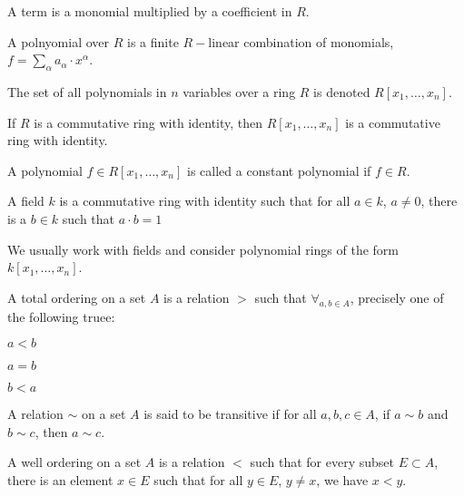 \documentclass[crop=false,class=article,oneside]{standalone}
\begin{document}
    \begin{definition}
    A term is a monomial multiplied by a coefficient in $R$.
    \end{definition}
    \begin{definition}
    A polnyomial over $R$ is a finite $R-$linear combination of monomials, $f=\sum_{\alpha} a_{\alpha} \cdot x^{\alpha}$.
    \end{definition}
    \begin{notation}
    The set of all polynomials in $n$ variables over a ring $R$ is denoted $R[x_1,\hdots, x_n]$.
    \end{notation}
    \begin{theorem}
    If $R$ is a commutative ring with identity, then $R[x_1,\hdots, x_n]$ is a commutative ring with identity.
    \end{theorem}
    \begin{definition}
    A polynomial $f\in R[x_1,\hdots, x_n]$ is called a constant polynomial if $f\in R$.
    \end{definition}
    \begin{definition}
    A field $k$ is a commutative ring with identity such that for all $a\in k$, $a\ne 0$, there is a $b\in k$ such that $a\cdot b=1$
    \end{definition}
    \begin{remark}
    We usually work with fields and consider polynomial rings of the form $k[x_1,\hdots ,x_n]$.
    \end{remark}
    \begin{definition}
    A total ordering on a set $A$ is a relation $>$ such that $\forall_{a,b\in A}$, precisely one of the following truee:
    \begin{enumerate}
        \begin{multicols}{3}
        \item $a<b$
        \item $a=b$
        \item $b<a$
        \end{multicols}
    \end{enumerate}
    \end{definition}
    \begin{definition}
    A relation $\sim$ on a set $A$ is said to be transitive if for all $a,b,c\in A$, if $a\sim b$ and $b\sim c$, then $a\sim c$.
    \end{definition}
    \begin{definition}
    A well ordering on a set $A$ is a relation $<$ such that for every subset $E\subset A$, there is an element $x\in E$ such that for all $y\in E$, $y\ne x$, we have $x<y$.
    \end{definition}
\end{document}
